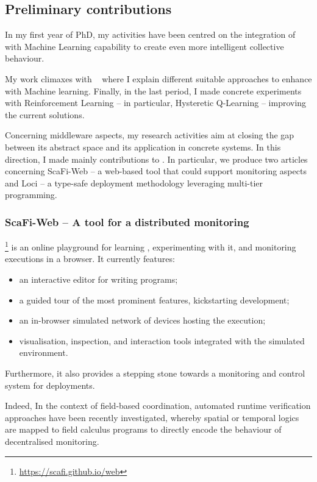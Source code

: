 \documentclass[11pt]{article}
\begin{document}
\subsection{Preliminary contributions}
In my first year of PhD, my activities have been centred on
the integration of \ac{} with Machine Learning capability to create even more
intelligent collective behaviour. 

My work climaxes with ~\cite{research} where I explain different suitable approaches to
enhance \ac{} with Machine learning. Finally, in the last period, I made concrete
experiments with Reinforcement Learning -- in particular, Hysteretic Q-Learning \cite{hysteretic-q} -- improving the current \ac{} solutions.

Concerning middleware aspects, my research activities aim at closing the gap between
its abstract space and its application in concrete systems. In this direction, I made mainly contributions to \scafi. In particular, we produce two articles concerning ScaFi-Web -- a web-based tool that could support monitoring aspects and \scafi Loci -- a type-safe deployment methodology leveraging multi-tier programming.
\subsubsection{ScaFi-Web -- A tool for a distributed monitoring}
\scafiweb{}\footnote{\url{https://scafi.github.io/web}}
 is an online playground for learning \ac{}, experimenting with it, and monitoring executions in a browser.
It currently features:
\begin{itemize}
 \item an interactive editor for writing \scafi{} programs;
 \item a guided tour of the most prominent features, kickstarting development;
 \item an in-browser simulated network of devices hosting the execution;
 \item visualisation, inspection, and interaction tools integrated with the simulated environment.
\end{itemize}

Furthermore, it also provides a stepping stone towards a monitoring and control system for \ac{} deployments.

Indeed, In the context of field-based coordination, automated runtime verification approaches have been recently investigated, whereby spatial or temporal logics are mapped to field calculus programs to directly encode the behaviour of decentralised monitoring.
\end{document}
